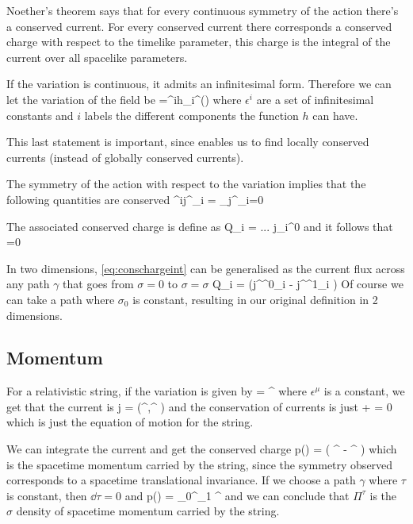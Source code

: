 \documentclass[oneside, 12pt]{book}
\begin{document}
Noether's theorem says that for every continuous symmetry of the action there's a conserved current. For every conserved current there corresponds a conserved charge with respect to the timelike parameter, this charge is the integral of the current over all spacelike parameters.\par

If the variation is continuous, it admits an infinitesimal form. Therefore we can let the variation of the field be
\beq[] \var{\phi^{\alpha}}=\epsilon^ih_i^{\alpha}(\phi) \eeq
where \(\epsilon^i\) are a set of infinitesimal constants and \(i\) labels the different components the function \(h\) can have.\par

This last statement is important, since enables us to find locally conserved currents (instead of globally conserved currents).\par

The symmetry of the action with respect to the variation implies that the following quantities are conserved
\beq[eq:noethercurrent] \epsilon^ij^{\alpha}_i =  \var{\phi^{\mu}} \del_{\alpha}j^{\alpha}_i=0\eeq\par

The associated conserved charge is define as
\beq[eq:conschargeint] Q_i = \int {}... j_i^0 \eeq
and it follows that
\beq[] =0 \eeq

In two dimensions, \eqref{eq:conschargeint} can be generalised as the current flux across any path \(\gamma\) that goes from \(\sigma = 0\) to \(\sigma = \sigma\)
\beq[] Q_i = \uint[\gamma] \left(j^{\sigma^0}_i - j^{\sigma^1}_i \right) \eeq
Of course we can take a path where \(\sigma_0 \) is constant, resulting in our original definition in 2 dimensions.

\subsection{Momentum}

For a relativistic string, if the variation is given by
\beq[]  = \epsilon^{\mu}\eeq
where \(\epsilon^{\mu}\) is a constant, we get that the current is
\beq[] j = \left(\Pi^{\tau},\Pi^{\sigma} \right) \eeq
and the conservation of currents is just
\beq[] \pdv{\Pi^{\tau}}{\tau} + \pdv{\Pi^{\sigma}}{\sigma} = 0\eeq
which is just the equation of motion for the string.\par
We can integrate the current and get the conserved charge
\beq[]  p(\tau) = \uint[\gamma] \left( \Pi^{\tau}\dd{\sigma} - \Pi^{\sigma}\dd{\tau} \right)\eeq
which is the spacetime momentum carried by the string, since the symmetry observed corresponds to a spacetime translational invariance. If we choose a path \(\gamma\) where \(\tau\) is constant, then \(\dd{\tau} =0\) and
\beq[eq:momentumsigmaint] p(\tau) = \int_0^{\sigma_1} \Pi^{\tau}\dd{\sigma} \eeq
and we can conclude that \(\Pi^{\tau} \) is the \(\sigma\) density of spacetime momentum carried by the string.\par
\end{document}
